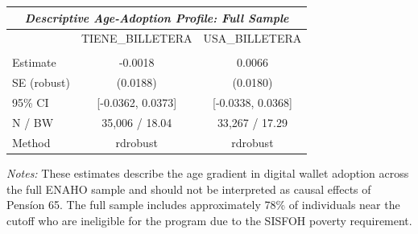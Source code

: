 \begin{threeparttable}
\begin{tabular}{l cc}
\toprule
\multicolumn{3}{c}{\textit{Descriptive Age-Adoption Profile: Full Sample}} \\
\midrule
  & TIENE\_BILLETERA & USA\_BILLETERA \\
\midrule
\addlinespace
\multicolumn{3}{l}{\textit{FULL\_descriptivo}} \\
  Estimate & -0.0018 & 0.0066 \\
  SE (robust) & (0.0188) & (0.0180) \\
  95\% CI & [-0.0362, 0.0373] & [-0.0338, 0.0368] \\
  N / BW & 35{,}006 / 18.04 & 33{,}267 / 17.29 \\
  Method & rdrobust & rdrobust \\
\bottomrule
\end{tabular}
\begin{tablenotes}
\small
\item \textit{Notes:} These estimates describe the age gradient in digital wallet adoption across the full ENAHO sample and should not be interpreted as causal effects of Pens\'ion 65. The full sample includes approximately 78\% of individuals near the cutoff who are ineligible for the program due to the SISFOH poverty requirement.
\end{tablenotes}
\end{threeparttable}